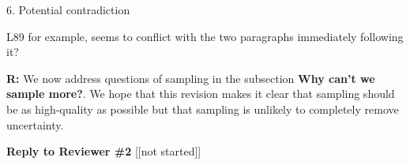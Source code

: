 \documentclass[12pt]{letter}
\newenvironment{refquote}{\bigskip \begin{it}}{\end{it}\smallskip}
\begin{document}
	6. Potential contradiction 

		\begin{refquote}
		L89 for example, seems to conflict with the two paragraphs immediately following it?
		\end{refquote}


		\textbf{R:} We now address questions of sampling in the subsection \textbf{Why can't we sample more?}. We hope that this revision makes it clear that sampling should be as high-quality as possible but that sampling is unlikely to completely remove uncertainty.




\clearpage


{\Large \bf Reply to Reviewer \#2} [[not started]]
\end{document}
